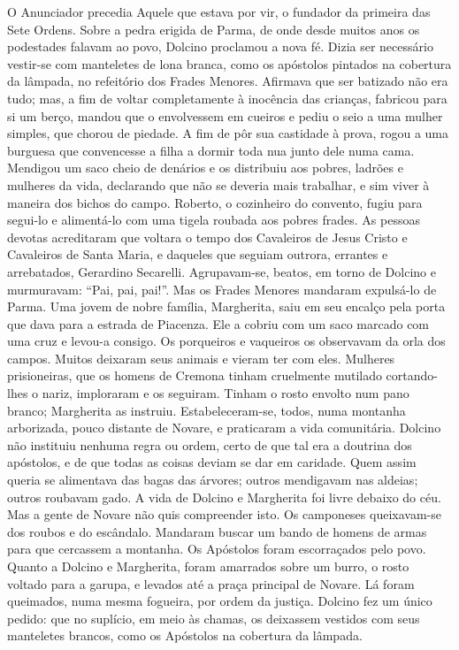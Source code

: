 O Anunciador precedia Aquele que estava por vir, o fundador da primeira das
Sete Ordens. Sobre a pedra erigida de Parma, de onde desde muitos anos os
podestades falavam ao povo, Dolcino proclamou a nova fé. Dizia ser
necessário vestir-se com manteletes de lona branca, como os apóstolos
pintados na cobertura da lâmpada, no refeitório dos Frades Menores.
Afirmava que ser batizado não era tudo; mas, a fim de voltar completamente
à inocência das crianças, fabricou para si um berço, mandou que o
envolvessem em cueiros e pediu o seio a uma mulher simples, que chorou de
piedade. A fim de pôr sua castidade à prova, rogou a uma burguesa que
convencesse a filha a dormir toda nua junto dele numa cama. Mendigou um
saco cheio de denários e os distribuiu aos pobres, ladrões e mulheres da
vida, declarando que não se deveria mais trabalhar, e sim viver à maneira
dos bichos do campo. Roberto, o cozinheiro do convento, fugiu para
segui-lo e alimentá-lo com uma tigela roubada aos pobres frades. As
pessoas devotas acreditaram que voltara o tempo dos Cavaleiros de Jesus
Cristo e Cavaleiros de Santa Maria, e daqueles que seguiam outrora,
errantes e arrebatados, Gerardino Secarelli. Agrupavam-se, beatos, em
torno de Dolcino e murmuravam: “Pai, pai, pai!”. Mas os Frades Menores
mandaram expulsá-lo de Parma. Uma jovem de nobre família, Margherita, saiu
em seu encalço pela porta que dava para a estrada de Piacenza. Ele a
cobriu com um saco marcado com uma cruz e levou-a consigo. Os porqueiros e
vaqueiros os observavam da orla dos campos. Muitos deixaram seus animais e
vieram ter com eles. Mulheres prisioneiras, que os homens de Cremona
tinham cruelmente mutilado cortando-lhes o nariz, imploraram e os
seguiram. Tinham o rosto envolto num pano branco; Margherita as instruiu.
Estabeleceram-se, todos, numa montanha arborizada, pouco distante de
Novare, e praticaram a vida comunitária. Dolcino não instituiu nenhuma
regra ou ordem, certo de que tal era a doutrina dos apóstolos, e de que
todas as coisas deviam se dar em caridade. Quem assim queria se alimentava
das bagas das árvores; outros mendigavam nas aldeias; outros roubavam
gado. A vida de Dolcino e Margherita foi livre debaixo do céu. Mas a gente
de Novare não quis compreender isto. Os camponeses queixavam-se dos roubos
e do escândalo. Mandaram buscar um bando de homens de armas para que
cercassem a montanha. Os Apóstolos foram escorraçados pelo povo. Quanto a
Dolcino e Margherita, foram amarrados sobre um burro, o rosto voltado para
a garupa, e levados até a praça principal de Novare. Lá foram queimados,
numa mesma fogueira, por ordem da justiça. Dolcino fez um único pedido:
que no suplício, em meio às chamas, os deixassem vestidos com seus
manteletes brancos, como os Apóstolos na cobertura da lâmpada.

